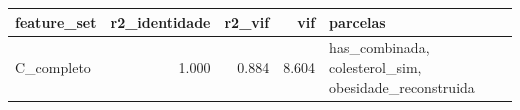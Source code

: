 \begin{tabular}{lrrrl}
\toprule
feature_set & r2_identidade & r2_vif & vif & parcelas \\
\midrule
C_completo & 1.000 & 0.884 & 8.604 & has_combinada, colesterol_sim, obesidade_reconstruida \\
\bottomrule
\end{tabular}
